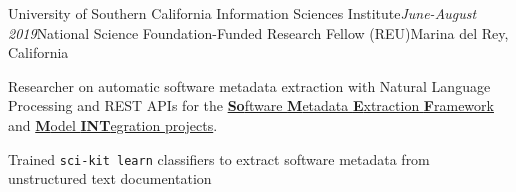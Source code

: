 \begin{rSubsection}{University of Southern California Information Sciences Institute}{\em June-August 2019}{National Science Foundation-Funded Research Fellow (REU)}{Marina del Rey, California} 
\item Researcher on automatic software metadata extraction  with Natural Language Processing and REST APIs for the \href{https://github.com/KnowledgeCaptureAndDiscovery/somef}{\textbf{So}ftware \textbf{M}etadata \textbf{E}xtraction \textbf{F}ramework} and \href{http://mint-project.info/}{\textbf{M}odel \textbf{INT}egration projects}.
\item Trained \texttt{sci-kit learn} classifiers to extract software metadata from unstructured text documentation 
\end{rSubsection}